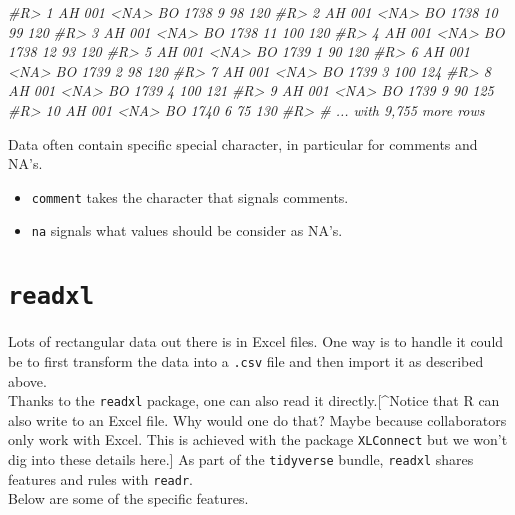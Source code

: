 \documentclass[]{book}
\newenvironment{Shaded}{}{}
\newcommand{\CommentTok}[1]{\textcolor[rgb]{0.38,0.63,0.69}{\textit{#1}}}
\newcommand{\DataTypeTok}[1]{\textcolor[rgb]{0.56,0.13,0.00}{#1}}
\newcommand{\DecValTok}[1]{\textcolor[rgb]{0.25,0.63,0.44}{#1}}
\newcommand{\KeywordTok}[1]{\textcolor[rgb]{0.00,0.44,0.13}{\textbf{#1}}}
\newcommand{\NormalTok}[1]{#1}
\newcommand{\OtherTok}[1]{\textcolor[rgb]{0.00,0.44,0.13}{#1}}
\newcommand{\StringTok}[1]{\textcolor[rgb]{0.25,0.44,0.63}{#1}}
\providecommand{\tightlist}{%
  \setlength{\itemsep}{0pt}\setlength{\parskip}{0pt}}
\theoremstyle{definition}
\theoremstyle{definition}
\theoremstyle{definition}
\theoremstyle{remark}
\begin{document}
\begin{Shaded}
\begin{Highlighting}[]
\CommentTok{#R>  1 AH    001   <NA>  BO     1738     9    98   120}
\CommentTok{#R>  2 AH    001   <NA>  BO     1738    10    99   120}
\CommentTok{#R>  3 AH    001   <NA>  BO     1738    11   100   120}
\CommentTok{#R>  4 AH    001   <NA>  BO     1738    12    93   120}
\CommentTok{#R>  5 AH    001   <NA>  BO     1739     1    90   120}
\CommentTok{#R>  6 AH    001   <NA>  BO     1739     2    98   120}
\CommentTok{#R>  7 AH    001   <NA>  BO     1739     3   100   124}
\CommentTok{#R>  8 AH    001   <NA>  BO     1739     4   100   121}
\CommentTok{#R>  9 AH    001   <NA>  BO     1739     9    90   125}
\CommentTok{#R> 10 AH    001   <NA>  BO     1740     6    75   130}
\CommentTok{#R> # ... with 9,755 more rows}
\end{Highlighting}
\end{Shaded}

Data often contain specific special character, in particular for
comments and NA's.

\begin{itemize}
\tightlist
\item
  \texttt{comment} takes the character that signals comments.
\item
  \texttt{na} signals what values should be consider as NA's.
\end{itemize}

\begin{Shaded}
\end{Shaded}

\hypertarget{readxl}{%
\section{\texorpdfstring{\texttt{readxl}}{readxl}}\label{readxl}}

Lots of rectangular data out there is in Excel files. One way is to
handle it could be to first transform the data into a \texttt{.csv} file
and then import it as described above.\\
Thanks to the \texttt{readxl} package, one can also read it
directly.{[}\^{}Notice that R can also write to an Excel file. Why would
one do that? Maybe because collaborators only work with Excel. This is
achieved with the package \texttt{XLConnect} but we won't dig into these
details here.{]} As part of the \texttt{tidyverse} bundle,
\texttt{readxl} shares features and rules with \texttt{readr}.\\
Below are some of the specific features.
\end{document}
